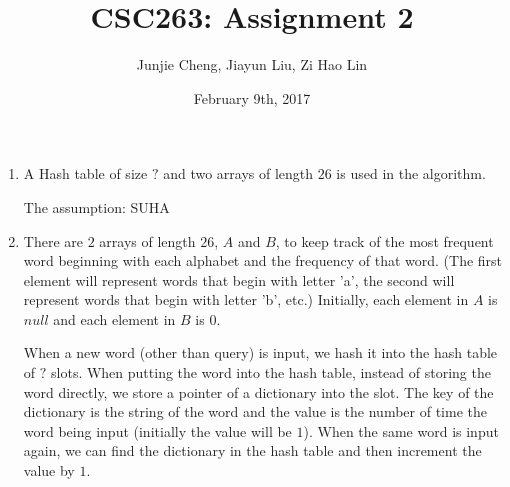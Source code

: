 \documentclass[11pt, answers]{exam}
\theoremstyle{plain}
\theoremstyle{definition}
\begin{document}
 


\title{CSC263: Assignment 2}
\date{February 9th, 2017}
\author{Junjie Cheng, Jiayun Liu, Zi Hao Lin}
\maketitle

\unframedsolutions

\begin{questions}
\question
\begin{solution}
\end{solution}

\question
\begin{solution}

\end{solution}


\question
\begin{solution}
\begin{enumerate}
\item A Hash table of size $?$ and two arrays of length $26$ is used in the algorithm.

The assumption: SUHA%

\item There are $2$ arrays of length $26$, $A$ and $B$, to keep track of the most frequent word beginning with each alphabet and the frequency of that word. (The first element will represent words that begin with letter 'a', the second will represent words that begin with letter 'b', etc.) Initially, each element in $A$ is $null$ and each element in $B$ is $0$. 

When a new word (other than query) is input, we hash it into the hash table of $?$ slots. When putting the word into the hash table, instead of storing the word directly, we store a pointer of a dictionary into the slot. The key of the dictionary is the string of the word and the value is the number of time the word being input (initially the value will be $1$). When the same word is input again, we can find the dictionary in the hash table and then increment the value by $1$. 


\end{enumerate}
\end{solution}
\end{questions}
\end{document}
